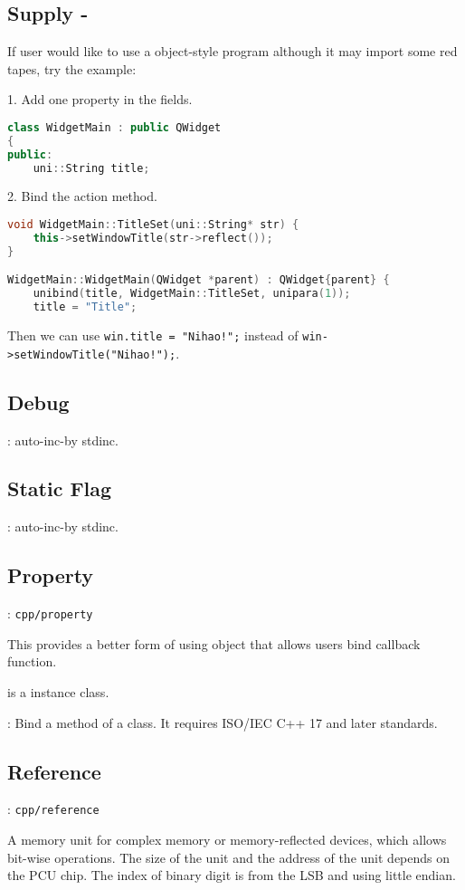 \subsection{Supply \mbox{-} }

If user would like to use a object-style program although it may import some red tapes, try the example:

1. Add one property in the fields.
\begin{lstlisting}[language=C++]
class WidgetMain : public QWidget
{
public:
	uni::String title;
\end{lstlisting}

2. Bind the action method.
\begin{lstlisting}[language=C++]
void WidgetMain::TitleSet(uni::String* str) {
	this->setWindowTitle(str->reflect());
}

WidgetMain::WidgetMain(QWidget *parent) : QWidget{parent} {
	unibind(title, WidgetMain::TitleSet, unipara(1));
	title = "Title";
\end{lstlisting}

Then we can use \verb|win.title = "Nihao!";| instead of \verb|win->setWindowTitle("Nihao!");|.

\subsection{Debug}
: auto-inc-by stdinc.

\subsection{Static Flag}
: auto-inc-by stdinc.

\subsection{Property}
: \verb`cpp/property`

This provides a better form of using object that allows users bind callback function.

 is a instance class.

: Bind a method of a class. It requires ISO/IEC C++ 17 and later standards.

\subsection{Reference}
: \verb`cpp/reference`

A memory unit for complex memory or memory-reflected devices, which allows bit-wise operations.
The size of {the unit} and {the address of the unit} depends on the PCU chip.
The index of binary digit is from the LSB and using little endian.

